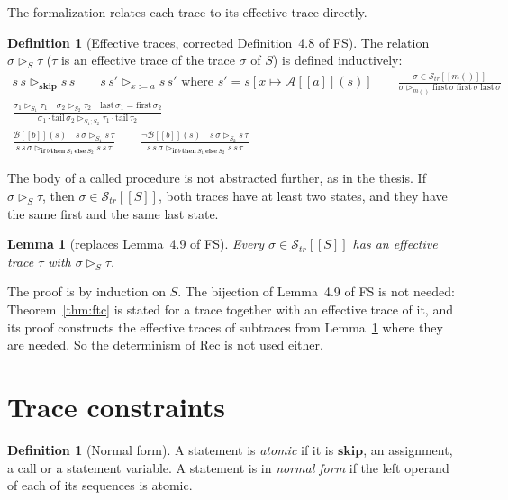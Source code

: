 \documentclass[11pt]{article}
\newcommand{\sem}[1]{[\![ #1 ]\!]}
\newcommand{\Str}{{\mathcal{S}_{\mathit{tr}}}}
\newcommand{\kw}[1]{\mathbf{#1}}
\newcommand{\skipS}{\kw{skip}}
\newcommand{\ite}[3]{\kw{if}\ #1\ \kw{then}\ #2\ \kw{else}\ #3}
\newcommand{\call}[1]{#1()}
\newcommand{\first}{\mathrm{first}}
\newcommand{\last}{\mathrm{last}}
\newcommand{\tl}{\mathrm{tail}}
\newcommand{\B}{\mathcal{B}}
\newcommand{\A}{\mathcal{A}}
\newcommand{\eff}{\rhd}
\newcommand{\Th}[1]{#1 of FS}
\theoremstyle{plain}
\newtheorem{lemma}[theorem]{Lemma}
\theoremstyle{definition}
\newtheorem{definition}[theorem]{Definition}
\theoremstyle{remark}
\begin{document}
The formalization relates each trace to its effective trace directly.

\begin{definition}[Effective traces, corrected \Th{Definition~4.8}]
  \label{def:eff}
  The relation $\sigma \eff_S \tau$ ($\tau$ is an effective trace of the
  trace $\sigma$ of $S$) is defined inductively:
  \begin{gather*}
    s\,s \eff_{\skipS} s\,s \qquad
    s\,s' \eff_{x := a} s\,s' \text{ where } s' = s[x \mapsto \A\sem{a}(s)]
    \qquad
    \frac{\sigma \in \Str\sem{\call{m}}}
         {\sigma \eff_{\call{m}} \first\,\sigma\ \first\,\sigma\ \last\,\sigma}
    \\[0.5em]
    \frac{\sigma_1 \eff_{S_1} \tau_1 \quad \sigma_2 \eff_{S_2} \tau_2 \quad
          \last\,\sigma_1 = \first\,\sigma_2}
         {\sigma_1 \cdot \tl\,\sigma_2 \eff_{S_1; S_2}
          \tau_1 \cdot \tl\,\tau_2}
    \\[0.5em]
    \frac{\B\sem{b}(s) \quad s\,\sigma \eff_{S_1} s\,\tau}
         {s\,s\,\sigma \eff_{\ite{b}{S_1}{S_2}} s\,s\,\tau}
    \qquad
    \frac{\lnot\B\sem{b}(s) \quad s\,\sigma \eff_{S_2} s\,\tau}
         {s\,s\,\sigma \eff_{\ite{b}{S_1}{S_2}} s\,s\,\tau}
  \end{gather*}
\end{definition}

The body of a called procedure is not abstracted further, as in the
thesis. If $\sigma \eff_S \tau$, then $\sigma \in \Str\sem{S}$, both traces
have at least two states, and they have the same first and the same last
state.

\begin{lemma}[replaces \Th{Lemma~4.9}]\label{lem:eff-exists}
  Every $\sigma \in \Str\sem{S}$ has an effective trace $\tau$ with
  $\sigma \eff_S \tau$.
\end{lemma}

The proof is by induction on $S$. The bijection of \Th{Lemma~4.9} is not
needed: Theorem~\ref{thm:ftc} is stated for a trace together with an
effective trace of it, and its proof constructs the effective traces of
subtraces from Lemma~\ref{lem:eff-exists} where they are needed. So the
determinism of Rec is not used either.

\section{Trace constraints}

\begin{definition}[Normal form]\label{def:nf}
  A statement is \emph{atomic} if it is $\skipS$, an assignment, a call or
  a statement variable. A statement is in \emph{normal form} if the left
  operand of each of its sequences is atomic.
\end{definition}
\end{document}
